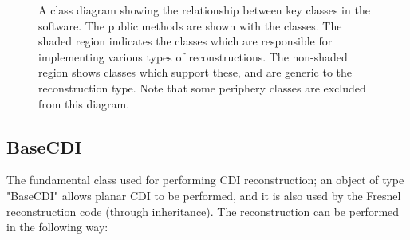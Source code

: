 \documentclass[]{nadia}
\begin{document}
\begin{center}
\begin{figure}
    \caption[]{A class diagram showing the relationship between key classes in the software. The public methods are shown with the  classes. The shaded region indicates the classes which are responsible for implementing various types of reconstructions. The non-shaded region shows classes which support these, and are generic to the reconstruction type. Note that some periphery classes are excluded from this diagram.\label{fig:class_diagram}}
  \end{figure}
\end{center}


\subsection{BaseCDI}
The fundamental class used for performing CDI reconstruction; an
object of type "BaseCDI" allows planar CDI to be performed, and it is
also used by the Fresnel reconstruction code (through inheritance).
The reconstruction can be performed in the following way:
\end{document}

